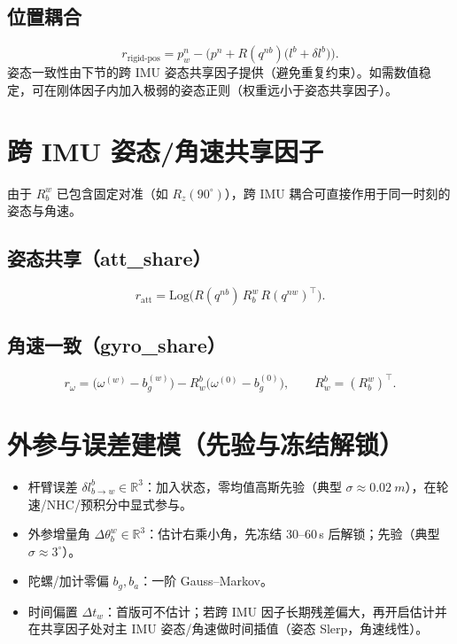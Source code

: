 \documentclass[11pt]{article}
\newcommand{\Log}{\mathrm{Log}}          %
\newcommand{\R}{\mathbb{R}}
\newcommand{\ang}[1]{#1^{\circ}}
\begin{document}
\subsection*{位置耦合}
\begin{equation}
r_{\mathrm{rigid\text{-}pos}} = p_{w}^n - \Big(p^n + R(q^{nb})\big(l^b + \delta l^b\big)\Big).
\end{equation}
姿态一致性由下节的跨 IMU 姿态共享因子提供（避免重复约束）。如需数值稳定，可在刚体因子内加入极弱的姿态正则（权重远小于姿态共享因子）。

\section{跨 IMU 姿态/角速共享因子}
由于 $R_b^{w}$ 已包含固定对准（如 $R_z(\ang{90})$），跨 IMU 耦合可直接作用于同一时刻的姿态与角速。

\subsection*{姿态共享（att\_share）}
\begin{equation}
r_{\mathrm{att}} = \Log\!\Big( R(q^{nb})\, R_b^{w}\, R(q^{nw})^\top \Big).
\end{equation}

\subsection*{角速一致（gyro\_share）}
\begin{equation}
r_{\omega} = \Big(\omega^{(w)} - b_g^{(w)}\Big) - R_w^{b}\Big(\omega^{(0)} - b_g^{(0)}\Big),
\qquad R_w^{b} = (R_b^{w})^\top.
\end{equation}

\section{外参与误差建模（先验与冻结解锁）}
\begin{itemize}
  \item 杆臂误差 $\delta l_{b\to w}^b \in \R^3$：加入状态，零均值高斯先验（典型 $\sigma\approx\SI{0.02}{m}$），在轮速/NHC/预积分中显式参与。
  \item 外参增量角 $\Delta \theta_b^w \in \R^3$：估计右乘小角，先冻结 $30$--$60$\,s 后解锁；先验（典型 $\sigma\approx \ang{3}$）。
  \item 陀螺/加计零偏 $b_g,b_a$：一阶 Gauss--Markov。
  \item 时间偏置 $\Delta t_w$：首版可不估计；若跨 IMU 因子长期残差偏大，再开启估计并在共享因子处对主 IMU 姿态/角速做时间插值（姿态 Slerp，角速线性）。
\end{itemize}
\end{document}
